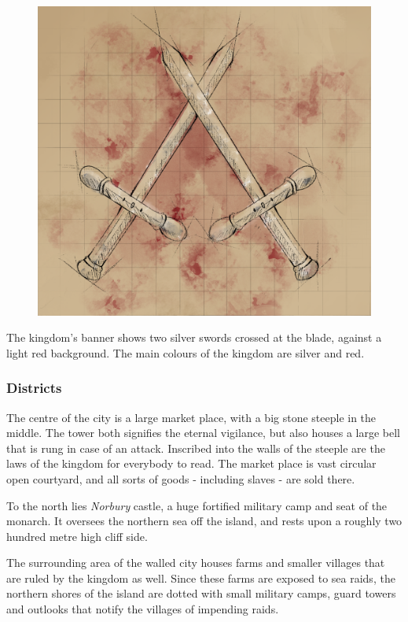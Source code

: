 \begin{figure}[!ht]
  \centering
  \includegraphics[width=0.9\linewidth]{media/norbury-bannersm.png}
\end{figure}

The kingdom's banner shows two silver swords crossed at the blade, against a
light red background. The main colours of the kingdom are silver and red.

\subsubsection*{Districts}

The centre of the city is a large market place, with a big stone steeple in
the middle. The tower both signifies the eternal vigilance, but also houses a
large bell that is rung in case of an attack. Inscribed into the walls of
the steeple are the laws of the kingdom for everybody to read. The market
place is vast circular open courtyard, and all sorts of goods - including
slaves - are sold there.

To the north lies \emph{Norbury} castle, a huge fortified military camp and
seat of the monarch. It oversees the northern sea off the island, and rests
upon a roughly two hundred metre high cliff side.

The surrounding area of the walled city houses farms and smaller villages that
are ruled by the kingdom as well. Since these farms are exposed to sea raids,
the northern shores of the island are dotted with small military camps, guard
towers and outlooks that notify the villages of impending raids.

